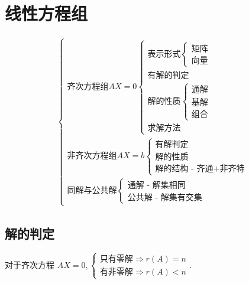 \chapter{线性方程组}

\begin{equation*}
    \begin{aligned}
        \begin{cases}
            \textrm{齐次方程组} AX = 0\begin{cases}
                \textrm{表示形式}\begin{cases}
                    \textrm{矩阵}\\ \textrm{向量}
                \end{cases}\\ 
                \textrm{有解的判定}\\ 
                \textrm{解的性质}\begin{cases}
                    \textrm{通解}\\ \textrm{基解}\\ \textrm{组合}
                \end{cases}\\ 
                \textrm{求解方法}
            \end{cases}\\ 
            \textrm{非齐次方程组} AX = b\begin{cases}
                \textrm{有解判定} \\ \textrm{解的性质} \\ \textrm{解的结构 - 齐通+非齐特}
            \end{cases}\\ 
            \textrm{同解与公共解}\begin{cases}
                \textrm{通解 - 解集相同}\\ \textrm{公共解 - 解集有交集}
            \end{cases}
        \end{cases}
    \end{aligned}
\end{equation*}

\section{解的判定}

对于齐次方程 $ AX = 0, \begin{cases}
    \textrm{只有零解}\Rightarrow r(A) = n\\ 
    \textrm{有非零解}\Rightarrow r(A) < n
\end{cases}. $ 

